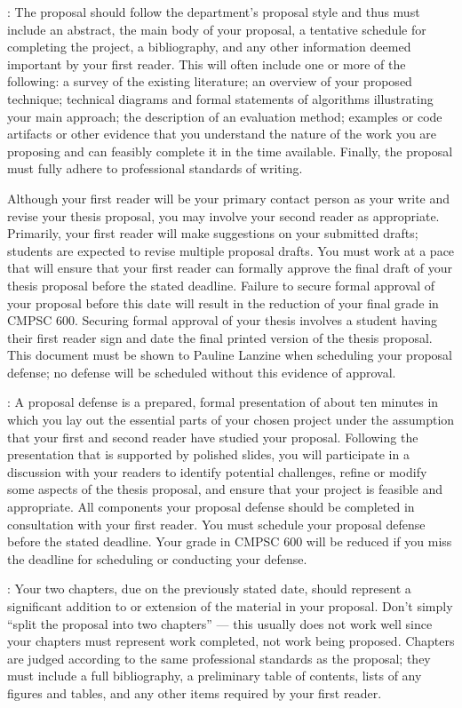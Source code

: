 \documentclass[11pt]{article}
\begin{document}
: The proposal should follow the department's proposal style and thus must include an
abstract, the main body of your proposal, a tentative schedule for completing the project, a bibliography, and any other
information deemed important by your first reader. This will often include one or more of the following: a survey of the
existing literature; an overview of your proposed technique; technical diagrams and formal statements of algorithms
illustrating your main approach; the description of an evaluation method; examples or code artifacts or other evidence that
you understand the nature of the work you are proposing and can feasibly complete it in the time available.  Finally, the
proposal must fully adhere to professional standards of writing.

Although your first reader will be your primary contact person as your write and revise your thesis proposal, you may
involve your second reader as appropriate. Primarily, your first reader will make suggestions on your submitted drafts;
students are expected to revise multiple proposal drafts.  You must work at a pace that will ensure that your first
reader can formally approve the final draft of your thesis proposal before the stated deadline. Failure to secure formal
approval of your proposal before this date will result in the reduction of your final grade in CMPSC 600.  Securing
formal approval of your thesis involves a student having their first reader sign and date the final printed version of
the thesis proposal. This document must be shown to Pauline Lanzine when scheduling your proposal defense; no defense
will be scheduled without this evidence of approval.

: A proposal defense is a prepared, formal presentation of about ten minutes in which you
lay out the essential parts of your chosen project under the assumption that your first and second reader have studied
your proposal.  Following the presentation that is supported by polished slides, you will participate in a discussion
with your readers to identify potential challenges, refine or modify some aspects of the thesis proposal, and ensure that
your project is feasible and appropriate. All components your proposal defense should be completed in consultation with
your first reader.  You must schedule your proposal defense before the stated deadline. Your grade in CMPSC 600 will be
reduced if you miss the deadline for scheduling or conducting your defense.

: Your two chapters, due on the previously stated date, should represent a significant
addition to or extension of the material in your proposal. Don't simply ``split the proposal into two chapters'' ---
this usually does not work well since your chapters must represent work completed, not work being proposed. Chapters are
judged according to the same professional standards as the proposal; they must include a full bibliography, a
preliminary table of contents, lists of any figures and tables, and any other items required by your first reader.
\end{document}
